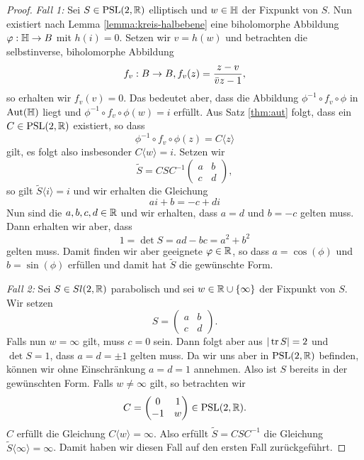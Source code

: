 \begin{proof}
  \emph{Fall 1:} Sei $S \in \operatorname{PSL}(2, \mathbb{R})$ elliptisch und $w \in \mathbb{H}$ der
  Fixpunkt von $S$. Nun existiert nach Lemma \ref{lemma:kreis-halbebene}
  eine biholomorphe Abbildung $\varphi: \mathbb{H} \rightarrow B$ mit $h(i) = 0$. Setzen
  wir $v = h(w)$ und betrachten die selbstinverse, biholomorphe
  Abbildung
  \[
  f_v : B \rightarrow B, f_v(z) = \frac{z-v}{\bar v z - 1},
  \]
  so erhalten wir $f_v(v) = 0$. Das bedeutet aber, dass die Abbildung
  $\phi^{-1} \circ f_v \circ \phi$ in $\operatorname{Aut}(\mathbb{H})$ liegt und $\phi^{-1}
  \circ f_v \circ \phi (w) = i$ erfüllt. Aus Satz \ref{thm:aut} folgt,
  dass ein $C \in \operatorname{PSL}(2, \mathbb{R})$ existiert, so dass
  \[
  \phi^{-1} \circ f_v \circ \phi(z) = C \langle z \rangle
  \]
  gilt, es folgt also insbesonder $C\langle w \rangle = i$. Setzen wir
  \[
  \tilde S = CSC^{-1}
  \begin{pmatrix}
    a & b\\
    c & d
  \end{pmatrix},
  \]
  so gilt $\tilde S\langle i \rangle = i$ und wir erhalten die
  Gleichung
  \[
  ai +b = -c + di
  \]
  Nun sind die $a,b,c,d \in \mathbb{R}$ und wir erhalten, dass $a = d$ und $b
  = - c$ gelten muss. Dann erhalten wir aber, dass
  \[
  1 = \det S = ad - bc = a^2 + b^2
  \]
  gelten muss. Damit finden wir aber geeignete $\varphi \in \mathbb{R}$, so dass
  $a = \cos(\phi)$ und $b = \sin(\phi)$ erfüllen und damit hat $\tilde
  S$ die gewünschte Form.

  \emph{Fall 2:} Sei $S \in Sl(2, \mathbb{R})$ parabolisch und sei $w \in \mathbb{R}
  \cup \{\infty\}$ der Fixpunkt von $S$. Wir setzen
  \[
  S =
  \begin{pmatrix}
    a & b\\
    c & d
  \end{pmatrix}.
  \]
  Falls nun $w = \infty$ gilt, muss $c =0$ sein. Dann folgt aber aus
  $|\operatorname{tr} S| = 2$ und $\det S = 1$, dass $a = d = \pm 1$ gelten
  muss. Da wir uns aber in $\operatorname{PSL}(2,\mathbb{R})$ befinden, können wir ohne
  Einschränkung $a = d = 1$ annehmen. Also ist $S$ bereits in der
  gewünschten Form. Falls $w \neq \infty$ gilt, so betrachten wir
  \[
  C =
  \begin{pmatrix}
    0 & 1 \\
    -1 & w
  \end{pmatrix}
  \in \operatorname{PSL}(2,\mathbb{R}).
  \]
  $C$ erfüllt die Gleichung $C \langle w \rangle  = \infty$. Also
  erfüllt $\tilde S = C S C^{-1}$ die Gleichung $\tilde S\langle \infty
  \rangle = \infty$. Damit haben wir diesen Fall auf den ersten Fall
  zurückgeführt.
  

\end{proof}
